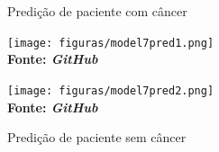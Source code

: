 \begin{figure}[ht]
\centering
\begin{minipage}{0.45\textwidth}
  \centering
  \caption[\hspace{0.1cm}Grade Computacional.]{Predição de paciente com câncer}
  \vspace{-0.4cm}
  \texttt{[image: figuras/model7pred1.png]}
  \captionsetup{justification=centering}
  \vspace{-0.2cm}
  \\\textbf{\footnotesize Fonte: \textit{GitHub}}
  \label{fig:predicao3}
\end{minipage}\hfill
\begin{minipage}{0.45\textwidth}
  \centering
  \caption[\hspace{0.1cm}Grade Computacional.]{Predição de paciente sem câncer}
  \vspace{-0.4cm}
  \texttt{[image: figuras/model7pred2.png]}
  \captionsetup{justification=centering}
  \vspace{-0.2cm}
  \\\textbf{\footnotesize Fonte: \textit{GitHub}}
  \label{fig:predicao4}
\end{minipage}
\end{figure}




